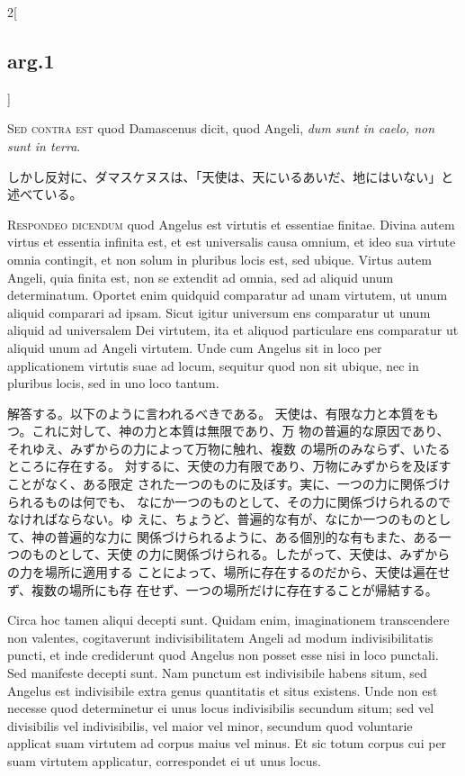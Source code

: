 \documentclass[paper=a4paper,fontsize=10pt,jafontsize=9pt,titlepage]{jlreq}
\begin{document}
\begin{paracol}{2}[\subsection{arg.1}]
\switchcolumn*[\subsection{s.c.}]

{\scshape Sed contra est} quod Damascenus dicit, quod
Angeli, {\itshape dum sunt in caelo, non sunt in terra}.

\switchcolumn

しかし反対に、ダマスケヌスは、「天使は、天にいるあいだ、地にはいない」と
 述べている。


{\scshape Respondeo dicendum} quod Angelus est virtutis
et essentiae finitae. Divina autem virtus et essentia infinita est, et
est universalis causa omnium, et ideo sua virtute omnia contingit, et
non solum in pluribus locis est, sed ubique. Virtus autem Angeli, quia
finita est, non se extendit ad omnia, sed ad aliquid unum
determinatum. Oportet enim quidquid comparatur ad unam virtutem, ut unum
aliquid comparari ad ipsam. Sicut igitur universum ens comparatur ut
unum aliquid ad universalem Dei virtutem, ita et aliquod particulare ens
comparatur ut aliquid unum ad Angeli virtutem. Unde cum Angelus sit in
loco per applicationem virtutis suae ad locum, sequitur quod non sit
ubique, nec in pluribus locis, sed in uno loco tantum.

\switchcolumn

解答する。以下のように言われるべきである。
天使は、有限な力と本質をもつ。これに対して、神の力と本質は無限であり、万
 物の普遍的な原因であり、それゆえ、みずからの力によって万物に触れ、複数
 の場所のみならず、いたるところに存在する。
対するに、天使の力有限であり、万物にみずからを及ぼすことがなく、ある限定
 された一つのものに及ぼす。実に、一つの力に関係づけられるものは何でも、
 なにか一つのものとして、その力に関係づけられるのでなければならない。ゆ
 えに、ちょうど、普遍的な有が、なにか一つのものとして、神の普遍的な力に
 関係づけられるように、ある個別的な有もまた、ある一つのものとして、天使
 の力に関係づけられる。したがって、天使は、みずからの力を場所に適用する
 ことによって、場所に存在するのだから、天使は遍在せず、複数の場所にも存
 在せず、一つの場所だけに存在することが帰結する。

\switchcolumn*

Circa hoc tamen
aliqui decepti sunt. Quidam enim, imaginationem transcendere non
valentes, cogitaverunt indivisibilitatem Angeli ad modum
indivisibilitatis puncti, et inde crediderunt quod Angelus non posset
esse nisi in loco punctali. Sed manifeste decepti sunt. Nam punctum est
indivisibile habens situm, sed Angelus est indivisibile extra genus
quantitatis et situs existens. Unde non est necesse quod determinetur ei
unus locus indivisibilis secundum situm; sed vel divisibilis vel
indivisibilis, vel maior vel minor, secundum quod voluntarie applicat
suam virtutem ad corpus maius vel minus. Et sic totum corpus cui per
suam virtutem applicatur, correspondet ei ut unus locus.


\end{paracol}
\end{document}
